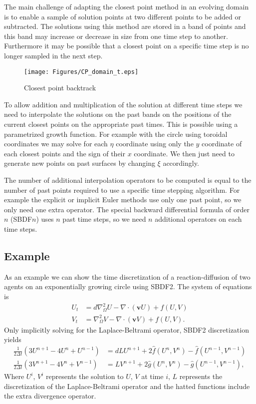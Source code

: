 \documentclass[fleqn,12pt]{siamart1116}
\begin{document}
The main challenge of adapting the closest point method in an evolving domain is to enable a sample of solution points at two different points to be added or subtracted. The solutions using this method are stored in a band of points and this band may increase or decrease in size from one time step to another. Furthermore it may be possible that a closest point on a specific time step is no longer sampled in the next step. 

\begin{figure}[ht]
	\centering
		\texttt{[image: Figures/CP\_domain\_t.eps]}
	\caption{Closest point backtrack}
	\label{fig:CP_domain_t}
\end{figure}

To allow addition and multiplication of the solution at different time steps we need to interpolate the solutions on the past bands on the positions of the current closest points on the appropriate past times. This is possible using a parametrized growth function. For example with the circle using toroidal coordinates we may solve for each $\eta$ coordinate using only the $y$ coordinate of each closest points and the sign of their $x$ coordinate. We then just need to generate new points on past surfaces by changing $\xi$ accordingly.

The number of additional interpolation operators to be computed is equal to the number of past points required to use a specific time stepping algorithm. For example the explicit or implicit Euler methods use only one past point, so we only need one extra operator. The special backward differential formula of order $n$ (SBDF$n$) uses $n$ past time steps, so we need $n$ additional operators on each time steps.

\subsection{Example}

As an example we can show the time discretization of a reaction-diffusion of two agents on an exponentially growing circle using SBDF2. The system of equations is
\begin{align}
U_t &= d\nabla^2_{\Omega} U - \nabla \cdot(\mathbf{v}U) + f(U, V)\\
V_t &= \nabla^2_{\Omega} V - \nabla \cdot(\mathbf{v}V) + f(U, V).
\end{align}
Only implicitly solving for the Laplace-Beltrami operator, SBDF2 discretization yields
\begin{align}
\frac{1}{2\Delta t}(3U^{n + 1} - 4U^n + U^{n-1}) &= dLU^{n+1} + 2\hat{f}(U^n, V^n) - \hat{f}(U^{n-1}, V^{n-1})\\
\frac{1}{2\Delta t}(3V^{n + 1} - 4V^n + V^{n-1}) &= LV^{n+1} + 2\hat{g}(U^n, V^n) - \hat{g}(U^{n-1}, V^{n-1}),
\end{align}
Where $U^i$, $V^i$ represents the solution to $U$, $V$ at time $i$, $L$ represents the discretization of the Laplace-Beltrami operator and the hatted functions include the extra divergence operator.
\end{document}
